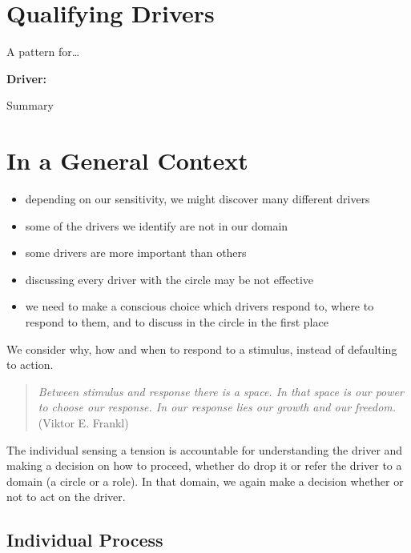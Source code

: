 \section{Qualifying Drivers}
\label{qualifyingdrivers}

A pattern for{\ldots}

\textbf{Driver:}

Summary

\section{In a General Context}
\label{inageneralcontext}

\begin{itemize}
\item depending on our sensitivity, we might discover many different drivers

\item some of the drivers we identify are not in our domain

\item some drivers are more important than others

\item discussing every driver with the circle may be not effective

\item we need to make a conscious choice which drivers respond to, where to respond to them, and to discuss in the circle in the first place

\end{itemize}

We consider why, how and when to respond to a stimulus, instead of defaulting to action.

\begin{quote}

\emph{Between stimulus and response there is a space. In that space is our power to choose our response. In our response lies our growth and our freedom.} (Viktor E. Frankl)
\end{quote}

The individual sensing a tension is accountable for understanding the driver and making a decision on how to proceed, whether do drop it or refer the driver to a domain (a circle or a role). In that domain, we again make a decision whether or not to act on the driver.

\subsection{Individual Process}
\label{individualprocess}

